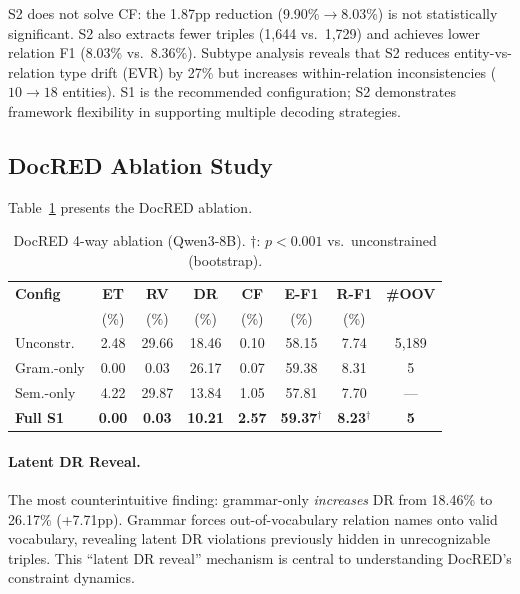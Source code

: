 \documentclass[11pt,a4paper]{article}
\begin{document}
S2 does not solve CF: the 1.87pp reduction (9.90\%$\to$8.03\%) is not statistically significant. S2 also extracts fewer triples (1,644 vs.\ 1,729) and achieves lower relation F1 (8.03\% vs.\ 8.36\%). Subtype analysis reveals that S2 reduces entity-vs-relation type drift (EVR) by 27\% but increases within-relation inconsistencies ($10 \to 18$ entities). S1 is the recommended configuration; S2 demonstrates framework flexibility in supporting multiple decoding strategies.

\subsection{DocRED Ablation Study}
\label{sec:docred-ablation}

Table~\ref{tab:docred-ablation} presents the DocRED ablation.

\begin{table}[t]
\centering
\small
\caption{DocRED 4-way ablation (Qwen3-8B). $\dagger$: $p{<}0.001$ vs.\ unconstrained (bootstrap).}
\label{tab:docred-ablation}
\begin{tabular}{lccccccc}
\toprule
\textbf{Config} & \textbf{ET} & \textbf{RV} & \textbf{DR} & \textbf{CF} & \textbf{E-F1} & \textbf{R-F1} & \textbf{\#OOV} \\
 & (\%) & (\%) & (\%) & (\%) & (\%) & (\%) & \\
\midrule
Unconstr. & 2.48 & 29.66 & 18.46 & 0.10 & 58.15 & 7.74 & 5,189 \\
Gram.-only & 0.00 & 0.03 & 26.17 & 0.07 & 59.38 & 8.31 & 5 \\
Sem.-only & 4.22 & 29.87 & 13.84 & 1.05 & 57.81 & 7.70 & --- \\
\textbf{Full S1} & \textbf{0.00} & \textbf{0.03} & \textbf{10.21} & \textbf{2.57} & \textbf{59.37}$^\dagger$ & \textbf{8.23}$^\dagger$ & \textbf{5} \\
\bottomrule
\end{tabular}
\end{table}

\paragraph{Latent DR Reveal.} The most counterintuitive finding: grammar-only \emph{increases} DR from 18.46\% to 26.17\% (+7.71pp). Grammar forces out-of-vocabulary relation names onto valid vocabulary, revealing latent DR violations previously hidden in unrecognizable triples. This ``latent DR reveal'' mechanism is central to understanding DocRED's constraint dynamics.
\end{document}
